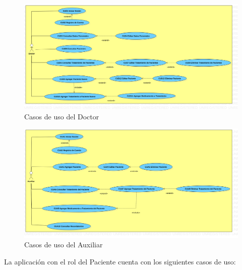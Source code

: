 \begin{figure}[htb]
	\centering
	\includegraphics[width=1.1\textwidth]{images/cap2/DCUDoctor2}
	\caption{Casos de uso del Doctor} \label{fig:casosdeusoD}
\end{figure}

\begin{figure}[htb]
	\centering
	\includegraphics[width=1.1\textwidth]{images/cap2/DCUAuxiliar2}
	\caption{Casos de uso del Auxiliar} \label{fig:casosdeusoA}
\end{figure}

La aplicación con el rol del Paciente cuenta con los siguientes casos de uso:

